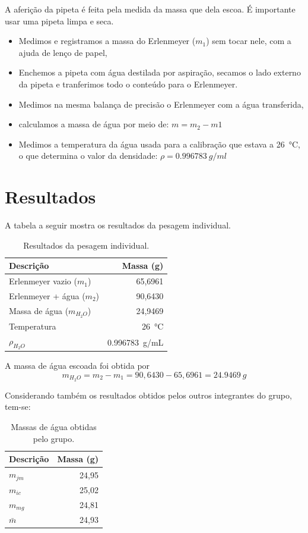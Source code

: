 \documentclass[a4paper,12pt]{article}
\begin{document}
A aferição da pipeta é feita pela medida da massa que dela escoa. É importante usar uma pipeta limpa e seca. 

\begin{itemize}
    \item Medimos e registramos a massa do Erlenmeyer ($m_1$) sem tocar nele, com a ajuda de lenço de papel,
    \item Enchemos a pipeta com água destilada por aspiração, secamos o lado externo da pipeta e tranferimos todo o conteúdo para o Erlenmeyer.
    \item Medimos na mesma balança de precisão o Erlenmeyer com a água transferida,
    \item calculamos a massa de água por meio de: $m=m_2-m1$
    \item Medimos a temperatura da água usada para a calibração que estava a \SI{26}{\degreeCelsius}, o que determina o valor da densidade: $\rho=\SI{0,996783}{g/ml}$
\end{itemize}

\section{Resultados}

A tabela a seguir mostra os resultados da pesagem individual.

\begin{table}[H]
\centering
\caption{Resultados da pesagem individual.}
\label{tab:result}
\begin{tabular}{lr}
\toprule
\textbf{Descrição} & \textbf{Massa (\si{g})} \\
\midrule
Erlenmeyer vazio ($m_1$)        & 65,6961 \\
Erlenmeyer + água ($m_2$)       & 90,6430 \\
Massa de água ($m_{H_2O}$)      & 24,9469 \\
Temperatura                     & \SI{26}{\degreeCelsius} \\
$\rho_{H_2O}$                   & \SI{0,996783}{g/mL} \\
\bottomrule
\end{tabular}
\end{table}

A massa de água escoada foi obtida por
\[
m_{H_2O}=m_2-m_1=90,6430-65,6961=\SI{24,9469}{g}
\]

Considerando também os resultados obtidos pelos outros integrantes do grupo, tem-se:

\begin{table}[H]
\centering
\caption{Massas de água obtidas pelo grupo.}
\label{tab:resfin}
\begin{tabular}{lr}
\toprule
\textbf{Descrição} & \textbf{Massa (\si{g})} \\
\midrule
$m_{jm}$      & 24,95 \\
$m_{ic}$      & 25,02 \\
$m_{mg}$      & 24,81 \\
$\bar{m}$     & 24,93 \\
\bottomrule
\end{tabular}
\end{table}
\end{document}
